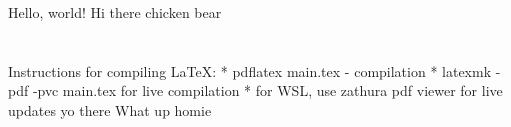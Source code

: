\documentclass{article}
\begin{document}
Hello, world!
Hi there chicken bear

\section{}
Instructions for compiling LaTeX:
* pdflatex main.tex - compilation
* latexmk -pdf -pvc main.tex for live compilation 
* for WSL, use zathura pdf viewer for live updates
yo
there
What up homie
\end{document}
